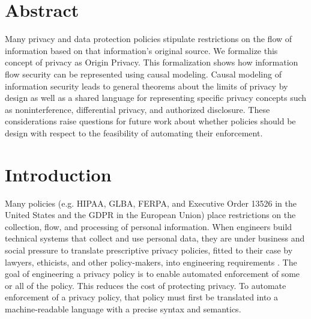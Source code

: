 \documentclass[../thesis.tex]{subfiles}
\begin{document}
 
 
\section{Abstract}
Many privacy and data protection policies stipulate
restrictions on the flow of information based on that
information's original source.
We formalize this concept of privacy as Origin Privacy.
This formalization shows how information flow security
can be represented using causal modeling.
Causal modeling of information security leads to
general theorems about the limits of privacy by design
as well as a shared language for representing specific
privacy concepts such as noninterference, differential
privacy, and authorized disclosure.
These considerations raise questions for future work
about whether policies should be design with respect
to the feasibility of automating their enforcement.


\section{Introduction}
\label{sec:orgheadline2}


Many policies (e.g. HIPAA, GLBA, FERPA, and
Executive Order 13526 in the United States and the GDPR
in the European Union) place restrictions on the collection,
flow, and processing of personal information. When engineers
build technical systems that collect and use personal data,
they are under business and social pressure to translate
prescriptive privacy policies, fitted to their case by
lawyers, ethicists, and other policy-makers, into engineering
requirements \cite{barth07csf,fisler2010embracing,swire14iapp,sen14sp}.
The goal of engineering a privacy policy is to enable automated 
enforcement of some or all of the policy.
This reduces the cost of protecting privacy.
To automate enforcement of a privacy policy, that policy must 
first be translated into a machine-readable language with a 
precise syntax and semantics.
\end{document}

